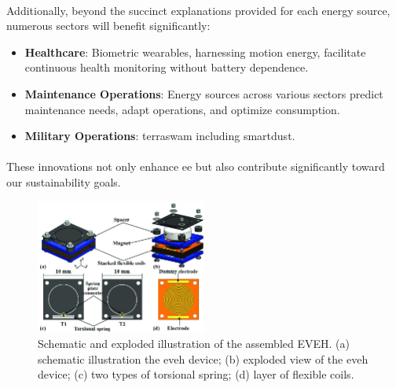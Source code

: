     \paragraph{}
    Additionally, beyond the succinct explanations provided for each energy source, numerous sectors will benefit significantly:
    \begin{itemize}
        \item \textbf{Healthcare}: Biometric wearables, harnessing motion energy, facilitate continuous health monitoring without battery dependence.
        \item \textbf{Maintenance Operations}: Energy sources across various sectors predict maintenance needs, adapt operations, and optimize consumption.
        \item \textbf{Military Operations}: \gls{terraswam} including \gls{smartdust}.
    \end{itemize}
    
    \paragraph{}
    These innovations not only enhance \gls{ee} but also contribute significantly toward our sustainability goals.
    

    \begin{figure}[htbp]
        \centering
        \includegraphics[width=0.5\textwidth]{img/006_EVEH.png}
        \caption{Schematic and exploded illustration of the assembled EVEH. (a) schematic illustration the \gls{eveh} device; (b) exploded view of the \gls{eveh} device; (c) two types of torsional spring; (d) layer of flexible coils\cite{eh_TorsionallyOscillatingMagnet}.}
        \label{fig:eveh}
    \end{figure}